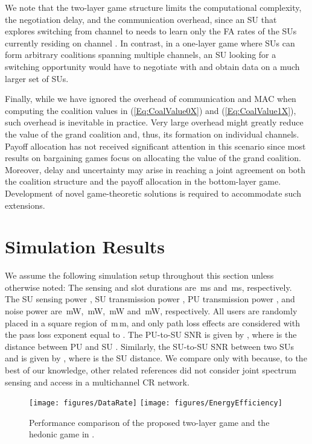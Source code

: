 \documentclass[journal,draftclsnofoot,onecolumn]{IEEEtran}
\theoremstyle{definition}
\def\FigScale{0.6}
\def\FigScale{0.65}
\begin{document}
We note that the two-layer game structure limits the computational complexity, the negotiation delay, and the communication overhead, since an SU that explores switching from channel  to  needs to learn only the FA rates of the SUs currently residing on channel . In contrast, in a one-layer game where SUs can form arbitrary coalitions spanning multiple channels, an SU looking for a switching opportunity would have to negotiate with and obtain data on a much larger set of SUs. 



Finally, while we have ignored the overhead of communication and MAC when computing the coalition values in (\ref{Eq:CoalValue0X}) and (\ref{Eq:CoalValue1X}), such overhead is inevitable in practice. Very large overhead might greatly reduce the value of the grand coalition and, thus, its formation on individual channels. Payoff allocation has not received significant attention in this scenario since most results on bargaining games focus on allocating the value of the grand coalition. Moreover, delay and uncertainty may arise in reaching a joint agreement on both the coalition structure and the payoff allocation in the bottom-layer game. Development of novel game-theoretic solutions is required to accommodate such extensions.

\section{Simulation Results}\label{Sec:Sim}
We assume the following simulation setup throughout this section unless otherwise noted: The sensing and slot durations are \,ms and \,ms, respectively. The SU sensing power , SU transmission power , PU transmission power , and noise power  are \,mW, \,mW, \,mW and \,mW, respectively. All users are randomly placed in a square region of \,m\,m, and only path loss effects are considered with the pass loss exponent equal to \cite{HedonicSenseGame}. The PU-to-SU SNR is given by , where  is the distance between PU  and SU . Similarly, the SU-to-SU SNR between two SUs  and  is given by , where  is the SU distance. We compare only with \cite{HedonicSenseGame} because, to the best of our knowledge, other related references did not consider joint spectrum sensing and access in a multichannel CR network.

\begin{figure}[!t]
    \centering
    \texttt{[image: figures/DataRate]}
		\texttt{[image: figures/EnergyEfficiency]}
    \caption{Performance comparison of the proposed two-layer game and the hedonic game in \cite{HedonicSenseGame}.}
    \label{Fig:EnergyEfficiency}
\end{figure}
\end{document}
